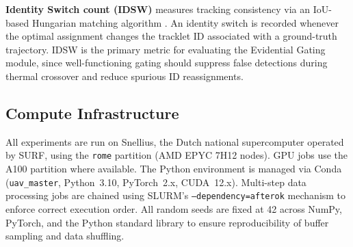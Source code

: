 \textbf{Identity Switch count (IDSW)} measures tracking consistency via an IoU-based Hungarian matching algorithm \cite{aharon2022bot}. An identity switch is recorded whenever the optimal assignment changes the tracklet ID associated with a ground-truth trajectory. IDSW is the primary metric for evaluating the Evidential Gating module, since well-functioning gating should suppress false detections during thermal crossover and reduce spurious ID reassignments.

\subsection{Compute Infrastructure}
\label{sec:infrastructure}

All experiments are run on Snellius, the Dutch national supercomputer operated by SURF, using the \texttt{rome} partition (AMD EPYC 7H12 nodes). GPU jobs use the A100 partition where available. The Python environment is managed via Conda (\texttt{uav\_master}, Python~3.10, PyTorch~2.x, CUDA~12.x). Multi-step data processing jobs are chained using SLURM's \texttt{--dependency=afterok} mechanism to enforce correct execution order. All random seeds are fixed at 42 across NumPy, PyTorch, and the Python standard library to ensure reproducibility of buffer sampling and data shuffling.
